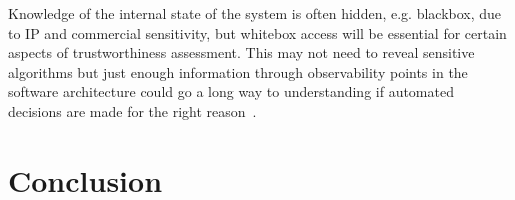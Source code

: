 Knowledge of the internal state of the system is often hidden, e.g. blackbox, due to IP and commercial sensitivity, but whitebox access will be essential for certain aspects of trustworthiness assessment. This may not need to reveal sensitive algorithms but just enough information through observability points in the software architecture could go a long way to understanding if automated decisions are made for the right reason~\cite{koopman2018toward}. 




\section{Conclusion}\label{conclusion}







% 




